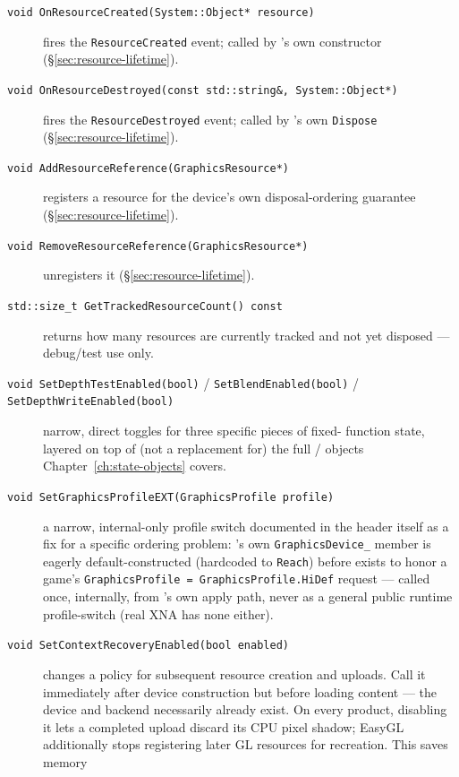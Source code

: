 \begin{description}
\item[\texttt{void OnResourceCreated(System::Object* resource)}] fires the
  \texttt{ResourceCreated} event; called by 's own constructor
  (\S\ref{sec:resource-lifetime}).
\item[\texttt{void OnResourceDestroyed(const std::string\&, System::Object*)}] fires
  the \texttt{ResourceDestroyed} event; called by 's own
  \texttt{Dispose} (\S\ref{sec:resource-lifetime}).
\item[\texttt{void AddResourceReference(GraphicsResource*)}] registers a resource for the
  device's own disposal-ordering guarantee (\S\ref{sec:resource-lifetime}).
\item[\texttt{void RemoveResourceReference(GraphicsResource*)}] unregisters it
  (\S\ref{sec:resource-lifetime}).
\item[\texttt{std::size\_t GetTrackedResourceCount() const}] returns how many resources are
  currently tracked and not yet disposed --- debug/test use only.
\item[\texttt{void SetDepthTestEnabled(bool)} / \texttt{SetBlendEnabled(bool)} /
  \texttt{SetDepthWriteEnabled(bool)}] narrow, direct toggles for three specific pieces of fixed-
  function state, layered on top of (not a replacement for) the full /
   objects Chapter~\ref{ch:state-objects} covers.
\item[\texttt{void SetGraphicsProfileEXT(GraphicsProfile profile)}] a narrow, internal-only
  profile switch documented in the header itself as a fix for a specific ordering problem:
  's own \texttt{GraphicsDevice\_} member is eagerly default-constructed
  (hardcoded to \texttt{Reach}) before  exists to honor a game's
  \texttt{GraphicsProfile = GraphicsProfile.HiDef} request --- called once, internally, from
  's own apply path, never as a general public runtime
  profile-switch (real XNA has none either).
\item[\texttt{void SetContextRecoveryEnabled(bool enabled)}] changes a policy for subsequent
  resource creation and uploads. Call it immediately after device construction but before
  loading content --- the device and backend necessarily already exist. On every product,
  disabling it lets a completed  upload discard its CPU pixel shadow;
  EasyGL additionally stops registering later GL resources for recreation. This saves memory

\end{description}
